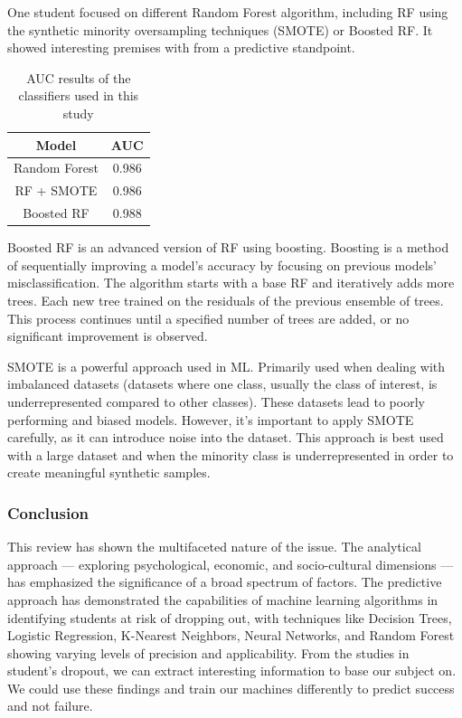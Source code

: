 \documentclass[conference]{IEEEtran}
\begin{document}
One student focused on different Random Forest algorithm, including RF using the synthetic minority oversampling techniques (SMOTE) or Boosted RF. It showed interesting premises with from a predictive standpoint. \cite{lee_machine_2019}
\begin{table}[H]
    \centering
    \caption{AUC results of the classifiers used in this study\cite{lee_machine_2019}}
    \begin{tabular}{|c|c|}
        \hline
        \textbf{Model} & \textbf{AUC}\\
        \hline
        Random Forest & 0.986 \\
        \hline
        RF + SMOTE & 0.986\\
        \hline
        Boosted RF & 0.988 \\
        \hline
    \end{tabular}
    \label{tab:auc_values_lee}
\end{table}

Boosted RF is an advanced version of RF using boosting. Boosting is a method of sequentially improving a model's accuracy by focusing on previous models' misclassification. The algorithm starts with a base RF and iteratively adds more trees. Each new tree trained on the residuals of the previous ensemble of trees. This process continues until a specified number of trees are added, or no significant improvement is observed.

SMOTE is a powerful approach used in ML. Primarily used when dealing with imbalanced datasets (datasets where one class, usually the class of interest, is underrepresented compared to other classes). These datasets lead to poorly performing and biased models.
However, it's important to apply SMOTE carefully, as it can introduce noise into the dataset. This approach is best used with a large dataset and when the minority class is underrepresented in order to create meaningful synthetic samples.

\vspace{8pt}
\subsubsection{Conclusion}
This review has shown the multifaceted nature of the issue. The analytical approach — exploring psychological, economic, and socio-cultural dimensions — has emphasized the significance of a broad spectrum of factors. The predictive approach has demonstrated the capabilities of machine learning algorithms in identifying students at risk of dropping out, with techniques like Decision Trees, Logistic Regression, K-Nearest Neighbors, Neural Networks, and Random Forest showing varying levels of precision and applicability.
From the studies in student's dropout, we can extract interesting information to base our subject on. We could use these findings and train our machines differently to predict success and not failure.
\end{document}
